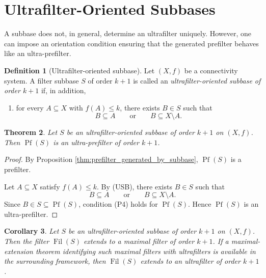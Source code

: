 \documentclass[10pt]{book}
\newtheorem{theorem}{Theorem}[section]
\newtheorem{corollary}[theorem]{Corollary}
\theoremstyle{definition}
\newtheorem{definition}[theorem]{Definition}
\begin{document}
\section{Ultrafilter-Oriented Subbases}

A subbase does not, in general, determine an ultrafilter uniquely.
However, one can impose an orientation condition ensuring that the generated prefilter behaves like an ultra-prefilter.

\begin{definition}[Ultrafilter-oriented subbase]
\label{def:ultrafilter_subbase}
Let \((X,f)\) be a connectivity system.
A filter subbase \(S\) of order \(k+1\) is called an \emph{ultrafilter-oriented subbase of order \(k+1\)} if, in addition,
\begin{enumerate}
    \item[(USB)] for every \(A\subseteq X\) with \(f(A)\leq k\), there exists \(B\in S\) such that
    \[
    B\subseteq A
    \qquad\text{or}\qquad
    B\subseteq X\setminus A.
    \]
\end{enumerate}
\end{definition}

\begin{theorem}
\label{thm:ultra_prefilter_generated_by_subbase}
Let \(S\) be an ultrafilter-oriented subbase of order \(k+1\) on \((X,f)\).
Then \(\operatorname{Pf}(S)\) is an ultra-prefilter of order \(k+1\).
\end{theorem}

\begin{proof}
By Proposition \ref{thm:prefilter_generated_by_subbase}, \(\operatorname{Pf}(S)\) is a prefilter.

Let \(A\subseteq X\) satisfy \(f(A)\leq k\).
By (USB), there exists \(B\in S\) such that
\[
B\subseteq A
\qquad\text{or}\qquad
B\subseteq X\setminus A.
\]
Since \(B\in S\subseteq \operatorname{Pf}(S)\), condition (P4) holds for \(\operatorname{Pf}(S)\).
Hence \(\operatorname{Pf}(S)\) is an ultra-prefilter.
\end{proof}

\begin{corollary}
\label{cor:subbase_extends_to_ultrafilter}
Let \(S\) be an ultrafilter-oriented subbase of order \(k+1\) on \((X,f)\).
Then the filter \(\operatorname{Fil}(S)\) extends to a maximal filter of order \(k+1\).
If a maximal-extension theorem identifying such maximal filters with ultrafilters is available in the surrounding framework, then \(\operatorname{Fil}(S)\) extends to an ultrafilter of order \(k+1\).
\end{corollary}
\end{document}
